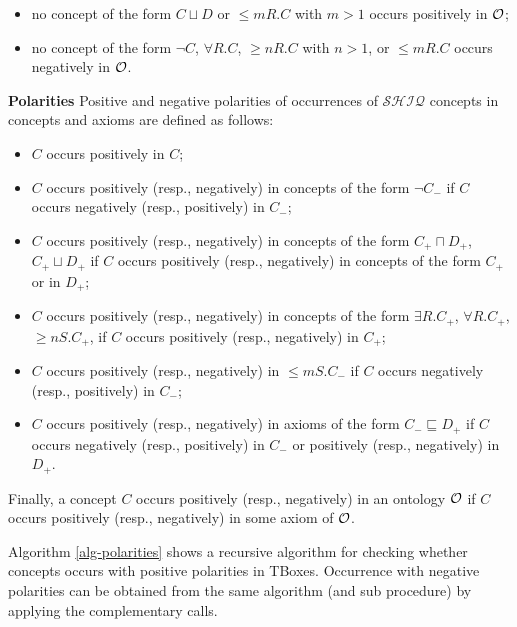 \documentclass[oneside]{book}
\newcommand{\shiq}{$\mathcal{SHIQ}$\xspace}
\newcommand{\dlisa}{\sqsubseteq}
\newcommand{\dland}{\sqcap}
\newcommand{\dlor}{\sqcup}
\begin{document}
\begin{itemize}
	\item no concept of the form $C \dlor D$ or $\leq mR.C$ with $m > 1$ occurs positively in $\cal O$;
	\item no concept of the form $\neg C$, $\forall R.C$, $\geq n R.C$ with $n > 1$, or $\leq mR.C$ occurs negatively in $\cal O$.
	
\end{itemize}

\textbf{Polarities} \- Positive and negative polarities of occurrences of \shiq concepts
in concepts and axioms are defined as follows:

\begin{itemize}
	\item $C$ occurs positively in $C$;
	\item $C$ occurs positively (resp., negatively) in concepts of the form $\neg C_-$ if $C$ occurs negatively (resp., positively) in $C_-$;
	\item $C$ occurs positively (resp., negatively) in concepts of the form $C_+ \dland D_+$, $C_+ \dlor D_+$ if $C$ occurs positively (resp., negatively) in concepts of the form $C_+$ or in $D_+$;
	\item $C$ occurs positively (resp., negatively) in concepts of the form $\exists R.C_+$, $\forall R.C_+$, $\geq nS.C_+$, if $C$ occurs positively (resp., negatively) in $C_+$;
	\item $C$ occurs positively (resp., negatively) in $\leq mS.C_-$ if $C$ occurs  negatively (resp., positively) in $C_-$;
	\item $C$ occurs positively (resp., negatively) in axioms of the form  $C_- \dlisa D_+$ if $C$ occurs negatively (resp., positively) in $C_-$ or positively (resp., negatively) in $D_+$.
\end{itemize}

Finally, a concept $C$ occurs positively (resp., negatively) in an ontology $\cal O$ if $C$ occurs positively (resp., negatively) in some axiom of $\cal O$. 

Algorithm \ref{alg-polarities} shows a recursive algorithm for checking whether concepts occurs with positive polarities in TBoxes. Occurrence with negative polarities can be obtained from the same algorithm (and sub procedure) by applying the complementary calls.

\
\end{document}
